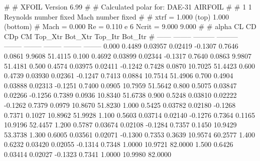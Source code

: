 #  
#       XFOIL         Version 6.99
#  
# Calculated polar for: DAE-31 AIRFOIL                                  
#  
# 1 1 Reynolds number fixed          Mach number fixed         
#  
# xtrf =   1.000 (top)        1.000 (bottom)  
# Mach =   0.000     Re =     0.110 e 6     Ncrit =   9.000  9.000
#  
#   alpha    CL        CD       CDp       CM     Top_Xtr  Bot_Xtr  Top_Itr  Bot_Itr
#  ------ -------- --------- --------- -------- -------- -------- -------- --------
   0.000   0.4489   0.03957   0.02419  -0.1307   0.7646   0.0861   9.9608  51.4115
   0.100   0.4692   0.03899   0.02344  -0.1317   0.7640   0.0863   9.9807  51.4181
   0.500   0.4574   0.03975   0.02411  -0.1242   0.7428   0.0870  10.7025  51.4423
   0.600   0.4739   0.03930   0.02361  -0.1247   0.7413   0.0884  10.7514  51.4906
   0.700   0.4904   0.03888   0.02313  -0.1251   0.7400   0.0905  10.7959  51.5642
   0.800   0.5075   0.03847   0.02266  -0.1256   0.7389   0.0936  10.8340  51.6738
   0.900   0.5248   0.03810   0.02222  -0.1262   0.7379   0.0979  10.8670  51.8230
   1.000   0.5425   0.03782   0.02180  -0.1268   0.7371   0.1027  10.8962  51.9928
   1.100   0.5603   0.03714   0.02140  -0.1276   0.7364   0.1165  10.9196  52.4457
   1.200   0.5787   0.03674   0.02108  -0.1284   0.7357   0.1450  10.9429  53.3738
   1.300   0.6005   0.03561   0.02071  -0.1300   0.7353   0.3639  10.9574  60.2577
   1.400   0.6232   0.03420   0.02055  -0.1314   0.7348   1.0000  10.9721  82.0000
   1.500   0.6426   0.03414   0.02027  -0.1323   0.7341   1.0000  10.9980  82.0000
